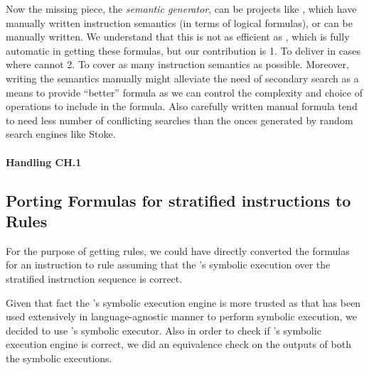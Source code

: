    Now the missing piece, the  \emph{semantic generator}, can be  projects like \Stoke, which have manually written instruction semantics (in terms of logical formulas), or can be manually written.  We understand that this is not as efficient as \Stoke, which is fully automatic in getting these formulas, but our contribution is 1. To deliver in cases where \Stoke cannot   2. To cover  as many instruction semantics as possible. Moreover, writing the semantics manually might alleviate the need of secondary search as a means to provide ``better'' formula as we can control the complexity and choice of operations to include in the formula. Also carefully written manual formula tend to need less number of conflicting searches than the onces generated by random search engines like Stoke.
   
   \paragraph{Handling CH.1}
   
  

\subsection{Porting Formulas for stratified instructions to \K Rules}

For the purpose of getting  \K rules, we could have directly converted the \Strata formulas
for an instruction to \K rule assuming that the \Strata's symbolic execution over the 
stratified instruction sequence is correct.

Given that fact the \K's symbolic execution engine is more trusted as 
that has been used extensively in language-agnostic manner to perform symbolic
execution, we decided to use \K's symbolic executor. Also in order to check 
if \Strata's symbolic execution engine is correct, we did an equivalence check on 
the outputs of both the symbolic executions.   
 

